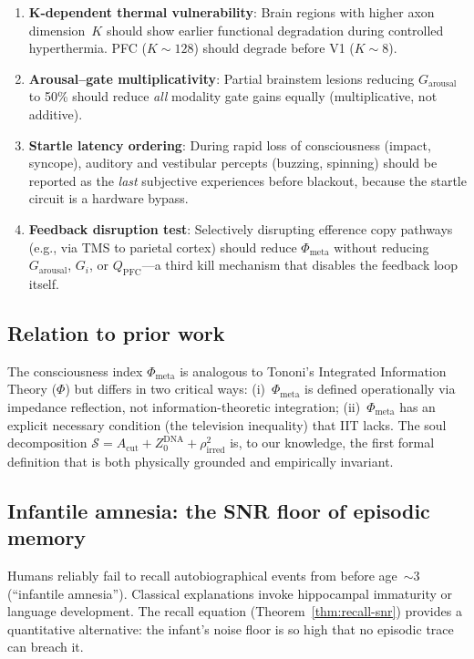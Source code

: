 \documentclass[aps,pre,twocolumn,superscriptaddress,floatfix]{revtex4-2}
\newcommand{\Phimeta}{\Phi_{\text{meta}}}
\newcommand{\Zarousal}{G_{\text{arousal}}}
\newcommand{\QPFC}{Q_{\text{PFC}}}
\newcommand{\Acut}{A_{\text{cut}}}
\begin{document}
\begin{enumerate}
  \item \textbf{K-dependent thermal vulnerability}:
    Brain regions with higher axon dimension~$K$ should show
    earlier functional degradation during controlled hyperthermia.
    PFC ($K\sim 128$) should degrade before V1 ($K\sim 8$).
  \item \textbf{Arousal--gate multiplicativity}:
    Partial brainstem lesions reducing $\Zarousal$ to 50\%
    should reduce \emph{all} modality gate gains equally
    (multiplicative, not additive).
  \item \textbf{Startle latency ordering}:
    During rapid loss of consciousness (impact, syncope),
    auditory and vestibular percepts (buzzing, spinning)
    should be reported as the \emph{last} subjective
    experiences before blackout, because the startle
    circuit is a hardware bypass.
  \item \textbf{Feedback disruption test}:
    Selectively disrupting efference copy pathways
    (e.g., via TMS to parietal cortex) should reduce
    $\Phimeta$ without reducing $\Zarousal$, $G_i$,
    or $\QPFC$---a third kill mechanism that disables the
    feedback loop itself.
\end{enumerate}

\subsection{Relation to prior work}

The consciousness index $\Phimeta$ is analogous to
Tononi's Integrated Information Theory ($\Phi$) but differs
in two critical ways:
(i)~$\Phimeta$ is defined operationally via impedance
reflection, not information-theoretic integration;
(ii)~$\Phimeta$ has an explicit necessary condition
(the television inequality) that IIT lacks.
The soul decomposition $\mathcal{S}=\Acut+Z_0^{\text{DNA}}+\rho_{\text{irred}}^2$
is, to our knowledge, the first formal definition that is
both physically grounded and empirically invariant.


\subsection{Infantile amnesia: the SNR floor of episodic memory}
\label{sec:infantile-amnesia}

Humans reliably fail to recall autobiographical events
from before age~$\sim$3 (``infantile amnesia'').
Classical explanations invoke hippocampal immaturity or
language development.  The recall equation
(Theorem~\ref{thm:recall-snr}) provides a
quantitative alternative: the infant's noise floor
is so high that no episodic trace can breach it.
\end{document}
